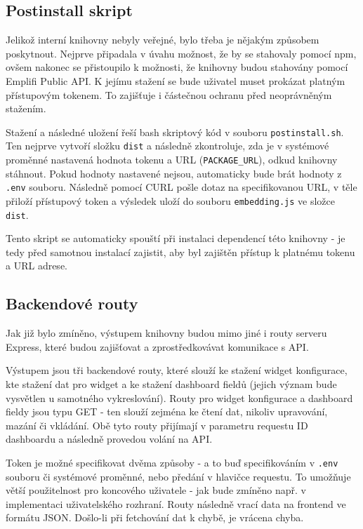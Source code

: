 \documentclass[czech, bc, kiv, he, iso690numb]{fasthesis}
\begin{document}
\subsection{Postinstall skript}

Jelikož interní knihovny nebyly veřejné, bylo třeba je nějakým způsobem poskytnout. Nejprve připadala v úvahu možnost, že by se stahovaly pomocí npm, ovšem
nakonec se přistoupilo k možnosti, že knihovny budou stahovány pomocí Emplifi Public API. K jejímu stažení se bude uživatel muset prokázat platným přístupovým tokenem.
To zajišťuje i částečnou ochranu před neoprávněným stažením.

Stažení a následné uložení řeší bash skriptový kód v souboru \texttt{postinstall.sh}. Ten nejprve vytvoří složku \texttt{dist} a následně zkontroluje, zda je v systémové proměnné
nastavená hodnota tokenu a URL (\texttt{PACKAGE\_URL}), odkud knihovny stáhnout. Pokud hodnoty nastavené nejsou, automaticky bude brát hodnoty z \texttt{.env} souboru. Následně pomocí CURL pošle dotaz na
specifikovanou URL, v těle přiloží přístupový token a výsledek uloží do souboru \texttt{embedding.js} ve složce \texttt{dist}.

Tento skript se automaticky spouští při instalaci dependencí této knihovny - je tedy před samotnou instalací zajistit, aby byl zajištěn přístup k platnému tokenu a URL adrese.

\subsection{Backendové routy}

Jak již bylo zmíněno, výstupem knihovny budou mimo jiné i routy serveru Express, které budou zajišťovat a zprostředkovávat komunikace s API.

Výstupem jsou tři backendové routy, které slouží ke stažení widget konfigurace, kte stažení dat pro widget a ke stažení dashboard fieldů (jejich význam bude vysvětlen u samotného vykreslování).
Routy pro widget konfigurace a dashboard fieldy jsou typu GET - ten slouží zejména ke čtení dat, nikoliv upravování, mazání či vkládání. Obě tyto routy přijímají v parametru requestu ID
dashboardu a následně provedou volání na API. 

Token je možné specifikovat dvěma způsoby - a to buď specifikováním v \texttt{.env} souboru či systémové proměnné, nebo předání v hlavičce requestu. To umožňuje větší použitelnost pro koncového
uživatele - jak bude zmíněno např. v implementaci uživatelského rozhraní. Routy následně vrací data na frontend ve formátu JSON. Došlo-li při fetchování dat k chybě, je vrácena chyba.
\end{document}
